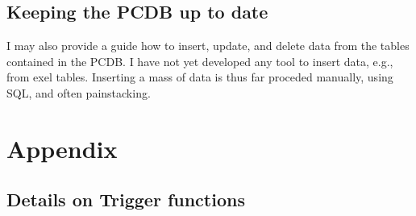 \documentclass[%
parskip=half-,%
fontsize=12pt,%
DIV=13,%
oneside,%
english,%
abstract=off,%
toc=chapterentrywithdots,toc=bibnumbered]{scrreprt}
\begin{document}












\section{Keeping the PCDB up to date}
I may also provide a guide how to insert, update, and delete data from the tables contained in the PCDB.
I have not yet developed any tool to insert data, e.g., from exel tables. Inserting a mass of data is thus far proceded manually, using SQL, and often painstacking.

\newpage 
\chapter{Appendix}
\section{Details on Trigger functions}




\end{document}
